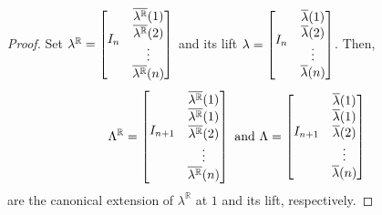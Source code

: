 \documentclass[11pt]{amsart}
\theoremstyle{plain}
\numberwithin{equation}{section}
\theoremstyle{definition}
\newcommand{\R}{\mathbb{R}}
\begin{document}
\begin{proof}
    Set $\lambda^\R = \begin{bmatrix}
                     \multirow{4}{*}{$I_n$}  & \overline{\lambda^\R}(1) \\
                      & \overline{\lambda^\R}(2) \\
                      & \vdots \\
                      & \overline{\lambda^\R}(n)
                   \end{bmatrix}$
    and its lift $\lambda = \begin{bmatrix}
                     \multirow{4}{*}{$I_n$}  & \overline{\lambda}(1) \\
                      & \overline{\lambda}(2) \\
                      & \vdots \\
                      & \overline{\lambda}(n)
                   \end{bmatrix}$.
    Then, 
    $$
       \Lambda^\R = \begin{bmatrix} \multirow{5}{*}{$I_{n+1}$}  & \overline{\lambda^\R}(1) \\
                                                                        & \overline{\lambda^\R}(1) \\
                                                                        & \overline{\lambda^\R}(2) \\
                                                                        & \vdots \\
                                                                        & \overline{\lambda^\R}(n)
                                                                \end{bmatrix} \text{ and }
        \Lambda = \begin{bmatrix} \multirow{5}{*}{$I_{n+1}$}  & \overline{\lambda}(1) \\
                                                                        & \overline{\lambda}(1) \\
                                                                        & \overline{\lambda}(2) \\
                                                                        & \vdots \\
                                                                        & \overline{\lambda}(n)
                                                                \end{bmatrix}
    $$
    are the canonical extension of $\lambda^\R$ at $1$ and its lift, respectively.
\end{proof}
\end{document}
